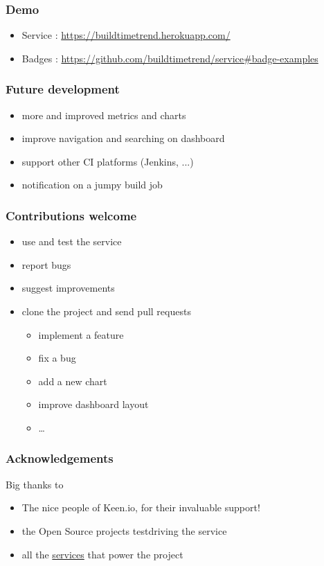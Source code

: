 \documentclass[14pt]{beamer}
\begin{document}
  \begin{frame}
    \frametitle{Demo}
    \begin{itemize}
      \item Service : \href{https://buildtimetrend.herokuapp.com/}{\small{https://buildtimetrend.herokuapp.com/}}
      \item Badges : \href{https://github.com/buildtimetrend/service\#badge-examples}{\small{https://github.com/buildtimetrend/service\#badge-examples}}
    \end{itemize}
  \end{frame}
  \begin{frame}
    \frametitle{Future development}
    \begin{itemize}
      \item more and improved metrics and charts
      \item improve navigation and searching on dashboard
      \item support other CI platforms (Jenkins, ...)
      \item notification on a jumpy build job
    \end{itemize}
  \end{frame}
  \begin{frame}
    \frametitle{Contributions welcome}
    \begin{itemize}
      \item use and test the service
      \item report bugs
      \item suggest improvements
      \item clone the project and send pull requests
      \begin{itemize}
        \item implement a feature
        \item fix a bug
        \item add a new chart
        \item improve dashboard layout
        \item \ldots
      \end{itemize}
    \end{itemize}
  \end{frame}
  \begin{frame}
    \frametitle{Acknowledgements}
    Big thanks to
    \begin{itemize}
      \item The nice people of Keen.io, for their invaluable support!
      \item the Open Source projects testdriving the service
      \item all the \href{https://github.com/buildtimetrend/python-lib/wiki/Credits}{services} that power the project
    \end{itemize}
  \end{frame}
\end{document}
